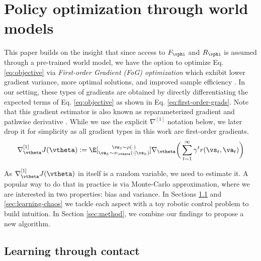 \documentclass{article} %
\begin{document}
\section{Policy optimization through world models} \label{sec:mbrl}

This paper builds on the insight that since access to $F_\vphi$ and $R_\vphi$ is assumed through a pre-trained world model, we have the option to optimize Eq. \ref{eq:objective} via \textit{First-order Gradient (FoG) optimization} which exhibit lower gradient variance, more optimal solutions, and improved sample efficiency \citet{mohamed2020monte}. In our setting, these types of gradients are obtained by directly differentiating the expected terms of Eq. \ref{eq:objective} as shown in Eq. \ref{eq:first-order-grads}. Note that this gradient estimator is also known as reparameterized gradient \citet{kingma2015variational} and pathwise derivative \citet{schulman2015gradient}. While we use the explicit $\nabla^{[1]}$ notation below, we later drop it for simplicity as all gradient types in this work are first-order gradients.
\begin{align}
    \label{eq:first-order-grads}
    \nabla_{\vtheta}^{[1]} J(\vtheta) := \E[\substack{\vs_1 \sim \rho(\cdot) \\ \va_h \sim \pi_\vtheta (\cdot | \vs_h)}]{\nabla_\vtheta \bigg( \sum_{t=1}^\infty \gamma^t r(\vs_t, \va_t) \bigg)}
\end{align}

As $\nabla_{\vtheta}^{[1]} J(\vtheta)$ in itself is a random variable, we need to estimate it. A popular way to do that in practice is via Monte-Carlo approximation, where we are interested in two properties: bias and variance. In Sections \ref{sec:learning-through-contact} and \ref{sec:learning-chaos} we tackle each aspect with a toy robotic control problem to build intuition. In Section \ref{sec:method}, we combine our findings to propose a new algorithm.

\subsection{Learning through contact} \label{sec:learning-through-contact}
\end{document}
